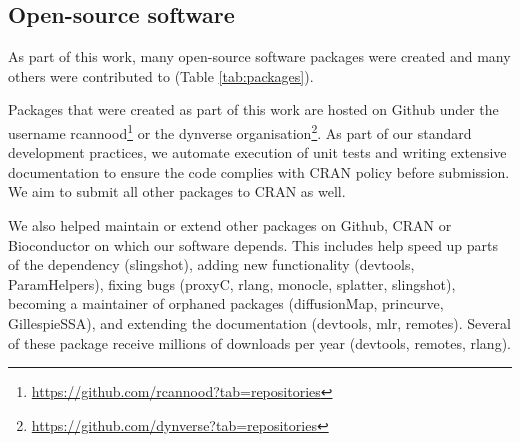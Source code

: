
\subsection{Open-source software}
As part of this work, many open-source software packages were created and many others were contributed to (Table \ref{tab:packages}). 

Packages that were created as part of this work are hosted on Github under the username rcannood\footnote{\url{https://github.com/rcannood?tab=repositories}} or the dynverse organisation\footnote{\url{https://github.com/dynverse?tab=repositories}}. As part of our standard development practices, we automate execution of unit tests and writing extensive documentation to ensure the code complies with CRAN policy before submission. We aim to submit all other packages to CRAN as well.

We also helped maintain or extend other packages on Github, CRAN or Bioconductor on which our software depends. This includes help speed up parts of the dependency (slingshot), adding new functionality (devtools, ParamHelpers), fixing bugs (proxyC, rlang, monocle, splatter, slingshot), becoming a maintainer of orphaned packages (diffusionMap, princurve, GillespieSSA), and extending the documentation (devtools, mlr, remotes). Several of these package receive millions of downloads per year (devtools, remotes, rlang).

\newcommand{\cranpkg}[1]{\href{https://cran.r-project.org/package=#1}{#1}}
\newcommand{\biocpkg}[1]{\href{https://bioconductor.org/packages/#1}{#1}}
\newcommand{\biocpkgl}[2]{\href{https://bioconductor.org/packages/#1}{#2}}
\newcommand{\githubpkg}[2]{\href{https://github.com/#1/#2}{#2}}
\newcommand{\notavailable}{}

%
%
%
%




